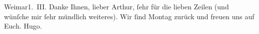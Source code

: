 \begin{ledgroupsized}[t]{13cm}
           \pstart
           \raggedleft{}Weimar1. III.\pend
           \pstart
           Danke Ihnen, lieber Arthur, ſehr für die lieben Zeilen (und wünſche
               mir ſehr mündlich weiteres). Wir ſind Montag zurück und freuen uns auf
               Euch.\pend
           \pstart \spacefill\mbox{Hugo.}\pend{}\endnumbering{}\end{ledgroupsized}  \newcommand{\dateiname}{L01915}\newcommand{\titel}{Hugo von Hofmannsthal an Arthur Schnitzler, 1. 3. 1910}\newcommand{\editorInnen}{Martin Anton Müller und Gerd-Hermann Susen}
      